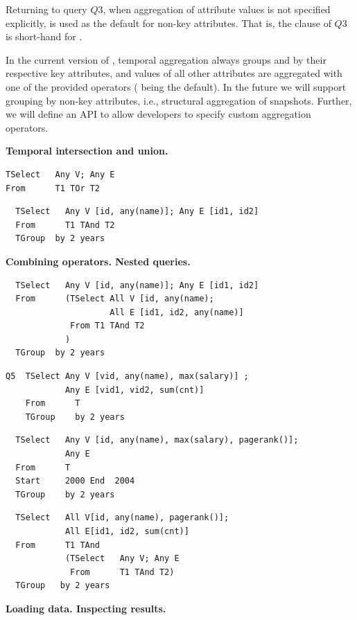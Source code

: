 Returning to query $Q3$, when aggregation of attribute values is not
specified explicitly,  is used as the default for non-key
attributes.  That is, the  clause of $Q3$ is short-hand
for  
.

In the current version of \ql, temporal aggregation always groups
 and  by their respective key attributes, and values
of all other attributes are aggregated with one of the provided
operators ( being the default).  In the future we will
support grouping by non-key attributes, i.e., structural aggregation
of snapshots.  Further, we will define an API to allow developers to
specify custom aggregation operators.

{\bf Temporal intersection and union.} 

\begin{verbatim}
TSelect   Any V; Any E
From      T1 TOr T2
\end{verbatim}

\begin{verbatim}
  TSelect   Any V [id, any(name)]; Any E [id1, id2]
  From      T1 TAnd T2
  TGroup  by 2 years
\end{verbatim}

{\bf Combining operators.  Nested queries.}

\begin{verbatim}
  TSelect   Any V [id, any(name)]; Any E [id1, id2]
  From      (TSelect All V [id, any(name); 
                     All E [id1, id2, any(name)]
             From T1 TAnd T2
            )
  TGroup  by 2 years
\end{verbatim}

\begin{verbatim}
Q5  TSelect Any V [vid, any(name), max(salary)] ; 
            Any E [vid1, vid2, sum(cnt)]
    From      T
    TGroup    by 2 years
\end{verbatim}

\begin{verbatim}
  TSelect   Any V [id, any(name), max(salary), pagerank()];
            Any E   
  From      T
  Start     2000 End  2004
  TGroup    by 2 years
\end{verbatim}


\begin{verbatim}
  TSelect   All V[id, any(name), pagerank()]; 
            All E[id1, id2, sum(cnt)]
  From      T1 TAnd  
            (TSelect   Any V; Any E
             From      T1 TAnd T2)
  TGroup   by 2 years
\end{verbatim}

{\bf Loading data.  Inspecting results.}

